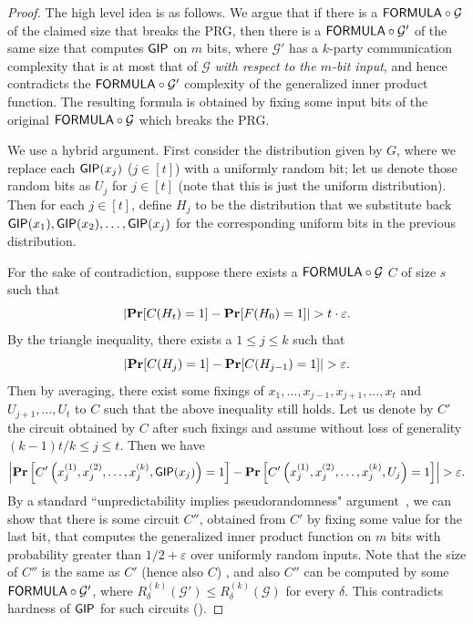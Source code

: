 \documentclass[10pt,a4paper]{article}
\DeclareMathOperator*\Prob{{\bf Pr}}
\newcommand{\FORMULA}{{\sf FORMULA}}
\newcommand{\GIP}{{\sf GIP}}
\newcommand{\uniform}{U}
\begin{document}
	\begin{proof}
		The high level idea is as follows. We argue that if there is a $\FORMULA \circ \mathcal{G}$ of the claimed size that breaks the PRG, then there is a $\FORMULA \circ \mathcal{G'}$ of the same size that computes $\GIP$ on $m$ bits, where $\mathcal{G'}$ has a $k$-party communication complexity that is at most that of $\mathcal{G}$ \emph{with respect to the $m$-bit input}, and hence contradicts the $\FORMULA \circ \mathcal{G'}$ complexity of the generalized inner product function. The resulting formula is obtained by fixing some input bits of the original $\FORMULA \circ \mathcal{G}$ which breaks the PRG.

		We use a hybrid argument. First consider the distribution given by $G$, where we replace each $\GIP(x_j)$ ($j\in[t]$) with a uniformly random bit; let us denote those random bits as $\uniform_{j}$ for $j\in[t]$ (note that this is just the uniform distribution). Then for each $j\in[t]$, define $H_j$ to be the distribution that we substitute back $\GIP(x_1),\GIP(x_2),\dots,\GIP(x_{j})$ for the corresponding uniform bits in the previous distribution. 

		For the sake of contradiction, suppose there exists a $\FORMULA \circ \mathcal{G}$ $C$ of size $s$ such that
		\[
			\left| \Prob[C(H_t)=1]-\Prob[F(H_0)=1] \right| > t\cdot\varepsilon.
		\]
		By the triangle inequality, there exists a $1\leq j\leq k$ such that
		\[
			\left| \Prob[C(H_j)=1]-\Prob[C(H_{j-1})=1] \right| >\varepsilon.
		\]
		Then by averaging, there exist some fixings of $x_1,\dots,x_{j-1},x_{j+1},\dots,x_{t}$ and $\uniform_{j+1},\dots,\uniform_{t}$ to $C$ such that the above inequality still holds. Let us denote by $C'$ the circuit obtained by $C$ after such fixings and assume without loss of generality $(k-1)t/k\leq j \leq t$. Then we have
		\begin{equation}\label{eq:distinguish}
		    \left| \Prob\left[C'\left(x_j^{(1)},x_j^{(2)},\dots,x_j^{(k)},\GIP(x_j)\right)=1\right]-\Prob\left[C'\left(x_j^{(1)},x_j^{(2)},\dots,x_j^{(k)},\uniform_j\right)=1\right] \right| > \varepsilon.
		\end{equation}
		By a standard ``unpredictability implies pseudorandomness" argument~\cite{Yao82}, we can show that there is some circuit $C''$, obtained from $C'$ by fixing some value for the last bit, that computes the generalized inner product function on $m$ bits with probability greater than $1/2+\varepsilon$ over uniformly random inputs. Note that the size of $C''$ is the same as $C'$ (hence also $C$) , and also $C''$ can be computed by some $\FORMULA \circ \mathcal{G'}$, where $R^{(k)}_{\delta}(\mathcal{G'})\leq R^{(k)}_{\delta}(\mathcal{G})$ for every $\delta$. This contradicts hardness of $\GIP$ for such circuits ().
	\end{proof}
	
\end{document}
